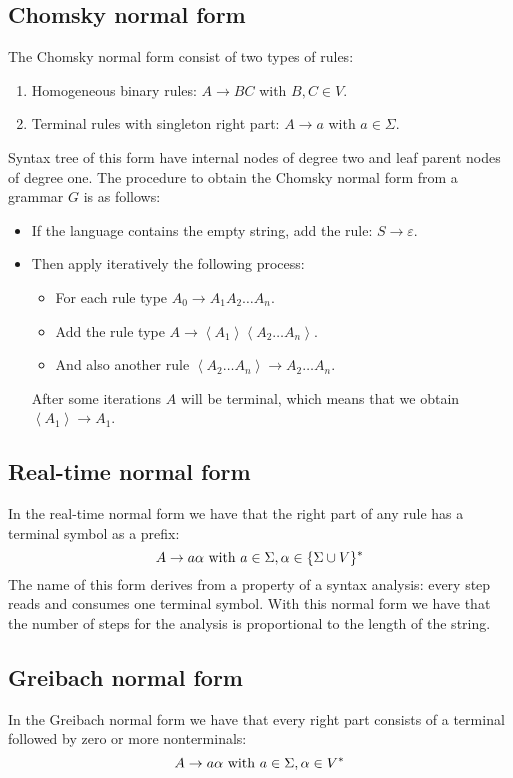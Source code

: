 \subsection*{Chomsky normal form}
The Chomsky normal form consist of two types of rules: 
\begin{enumerate}
    \item Homogeneous binary rules: $A \rightarrow BC$ with $B,C \in V$. 
    \item Terminal rules with singleton right part: $A \rightarrow a$ with $a \in \Sigma$.
\end{enumerate}
Syntax tree of this form have internal nodes of degree two and leaf parent nodes of degree one. 
The procedure to obtain the Chomsky normal form from a grammar $G$ is as follows: 
\begin{itemize}
    \item If the language contains the empty string, add the rule: $S \rightarrow \varepsilon$. 
    \item Then apply iteratively the following process: 
        \begin{itemize}
            \item For each rule type $A_0 \rightarrow A_1A_2\dots A_n$. 
            \item Add the rule type $A \rightarrow \left\langle A_1 \right\rangle\left\langle A_2\dots A_n\right\rangle $. 
            \item And also another rule $\left\langle A_2\dots A_n\right\rangle \rightarrow A_2\dots A_n$. 
        \end{itemize}
        After some iterations $A$ will be terminal, which means that we obtain $\left\langle A_1 \right\rangle\rightarrow A_1$. 
\end{itemize}

\subsection*{Real-time normal form}
In the real-time normal form we have that the right part of any rule has a terminal symbol as a prefix: 
\[A \rightarrow a \alpha \textnormal{ with } a \in \Sigma, \alpha \in \{\Sigma \cup V\}^{*}\]
The name of this form derives from a property of a syntax analysis: every step reads and consumes one terminal symbol. 
With this normal form we have that the number of steps for the analysis is proportional to the length of the string.

\subsection*{Greibach normal form}
In the Greibach normal form we have that every right part consists of a terminal followed by zero or more nonterminals: 
\[A \rightarrow a \alpha \textnormal{ with } a \in \Sigma, \alpha \in V^{*}\]